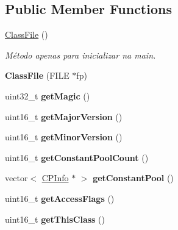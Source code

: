 \subsection*{Public Member Functions}
\begin{DoxyCompactItemize}
\item 
\hyperlink{classClassFile_a47669d90346c9fa0db30ae582c74a199}{Class\+File} ()
\begin{DoxyCompactList}\small\item\em Método apenas para inicializar na main. \end{DoxyCompactList}\item 
{\bfseries Class\+File} (F\+I\+LE $\ast$fp)\hypertarget{classClassFile_aed7c4bc94d4d7aff8785a262befa19fc}{}\label{classClassFile_aed7c4bc94d4d7aff8785a262befa19fc}

\item 
uint32\+\_\+t {\bfseries get\+Magic} ()\hypertarget{classClassFile_a7b981e486aada980cf8aa77669f4f578}{}\label{classClassFile_a7b981e486aada980cf8aa77669f4f578}

\item 
uint16\+\_\+t {\bfseries get\+Major\+Version} ()\hypertarget{classClassFile_aecde28e5d51413a4f1856385e0a2c642}{}\label{classClassFile_aecde28e5d51413a4f1856385e0a2c642}

\item 
uint16\+\_\+t {\bfseries get\+Minor\+Version} ()\hypertarget{classClassFile_a98a3170782cb82940f317f06f90c9398}{}\label{classClassFile_a98a3170782cb82940f317f06f90c9398}

\item 
uint16\+\_\+t {\bfseries get\+Constant\+Pool\+Count} ()\hypertarget{classClassFile_a72ea0eac7a8252056ee0c615afcd76fc}{}\label{classClassFile_a72ea0eac7a8252056ee0c615afcd76fc}

\item 
vector$<$ \hyperlink{classCPInfo}{C\+P\+Info} $\ast$ $>$ {\bfseries get\+Constant\+Pool} ()\hypertarget{classClassFile_a6268c973fcaf6247f7fe338f3ee54d7a}{}\label{classClassFile_a6268c973fcaf6247f7fe338f3ee54d7a}

\item 
uint16\+\_\+t {\bfseries get\+Access\+Flags} ()\hypertarget{classClassFile_a0426eeb52b8bcd0dfbee9dcaf368ad09}{}\label{classClassFile_a0426eeb52b8bcd0dfbee9dcaf368ad09}

\item 
uint16\+\_\+t {\bfseries get\+This\+Class} ()\hypertarget{classClassFile_a54c12b8a159a7952c668c094df9a6862}{}\label{classClassFile_a54c12b8a159a7952c668c094df9a6862}


\end{DoxyCompactItemize}
